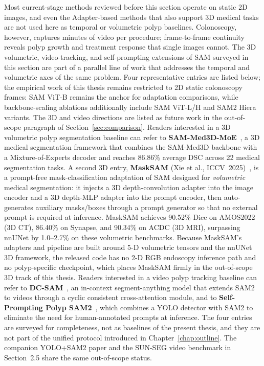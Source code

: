 Most current-stage methods reviewed before this section operate on static 2D images, and even the Adapter-based methods that also support 3D medical tasks are not used here as temporal or volumetric polyp baselines. Colonoscopy, however, captures minutes of video per procedure; frame-to-frame continuity reveals polyp growth and treatment response that single images cannot. The 3D volumetric, video-tracking, and self-prompting extensions of SAM surveyed in this section are part of a parallel line of work that addresses the temporal and volumetric axes of the same problem. Four representative entries are listed below; the empirical work of this thesis remains restricted to 2D static colonoscopy frames: SAM ViT-B remains the anchor for adaptation comparisons, while backbone-scaling ablations additionally include SAM ViT-L/H and SAM2 Hiera variants. The 3D and video directions are listed as future work in the out-of-scope paragraph of Section~\ref{sec:comparison}. Readers interested in a 3D volumetric polyp segmentation baseline can refer to \textbf{SAM-Med3D-MoE}~\cite{wang2024sammed3dmoe}, a 3D medical segmentation framework that combines the SAM-Med3D backbone with a Mixture-of-Experts decoder and reaches 86.86\% average DSC across 22 medical segmentation tasks. A second 3D entry, \textbf{MaskSAM} (Xie et al., ICCV~2025)~\cite{cheng2024masksam}, is a prompt-free mask-classification adaptation of SAM designed for \emph{volumetric} medical segmentation: it injects a 3D depth-convolution adapter into the image encoder and a 3D depth-MLP adapter into the prompt encoder, then auto-generates auxiliary masks/boxes through a prompt generator so that no external prompt is required at inference. MaskSAM achieves 90.52\% Dice on AMOS2022 (3D CT), 86.40\% on Synapse, and 90.34\% on ACDC (3D MRI), surpassing nnUNet by 1.0--2.7\% on these volumetric benchmarks. Because MaskSAM's adapters and pipeline are built around 5-D volumetric tensors and the nnUNet 3D framework, the released code has no 2-D RGB endoscopy inference path and no polyp-specific checkpoint, which places MaskSAM firmly in the out-of-scope 3D track of this thesis. Readers interested in a video polyp tracking baseline can refer to \textbf{DC-SAM}~\cite{qi2025dcsam}, an in-context segment-anything model that extends SAM2 to videos through a cyclic consistent cross-attention module, and to \textbf{Self-Prompting Polyp SAM2}~\cite{mansoori2024selfprompt}, which combines a YOLO detector with SAM2 to eliminate the need for human-annotated prompts at inference. The four entries are surveyed for completeness, not as baselines of the present thesis, and they are not part of the unified protocol introduced in Chapter~\ref{chap:outline}. The companion YOLO+SAM2 paper and the SUN-SEG video benchmark in Section~2.5 share the same out-of-scope status.

